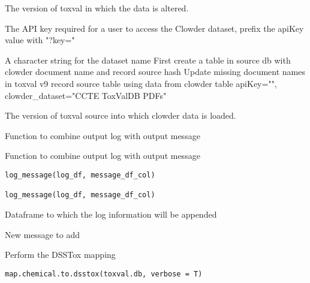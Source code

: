 \documentclass[letterpaper]{book}
\begin{document}
%
\begin{Arguments}
\begin{ldescription}
\item[\code{toxval.db}] The version of toxval in which the data is altered.

\item[\code{apiKey}] The API key required for a user to access the Clowder dataset, prefix the apiKey value with "?key="

\item[\code{clowder\_dataset}] A character string for the dataset name
First create a table in source db with clowder document name and record source hash
Update missing document names in toxval v9 record source table using data from clowder table
apiKey="", clowder\_dataset="CCTE ToxValDB PDFs"

\item[\code{source.db}] The version of toxval source into which clowder data is loaded.
\end{ldescription}
\end{Arguments}
%
\begin{Description}\relax
Function to combine output log with output message

Function to combine output log with output message
\end{Description}
%
\begin{Usage}
\begin{verbatim}
log_message(log_df, message_df_col)

log_message(log_df, message_df_col)
\end{verbatim}
\end{Usage}
%
\begin{Arguments}
\begin{ldescription}
\item[\code{log\_df}] Dataframe to which the log information will be appended

\item[\code{message\_df\_col}] New message to add
\end{ldescription}
\end{Arguments}
%
\begin{Description}\relax
Perform the DSSTox mapping
\end{Description}
%
\begin{Usage}
\begin{verbatim}
map.chemical.to.dsstox(toxval.db, verbose = T)
\end{verbatim}
\end{Usage}
\end{document}
